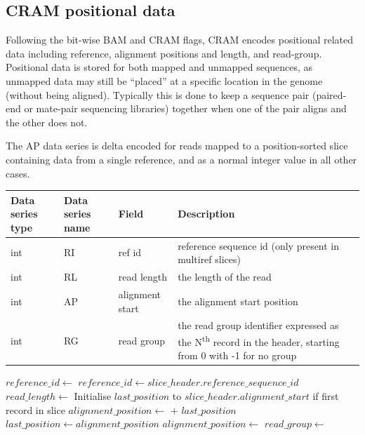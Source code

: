\documentclass[a4paper]{article}
\begin{document}
\subsection{\textbf{CRAM positional data}}
\label{subsec:positions}

Following the bit-wise BAM and CRAM flags, CRAM encodes positional related data including reference, alignment positions and length, and read-group.
Positional data is stored for both mapped and unmapped sequences, as unmapped data may still be ``placed'' at a specific location in the genome (without being aligned).
Typically this is done to keep a sequence pair (paired-end or mate-pair sequencing libraries) together when one of the pair aligns and the other does not.

The AP data series is delta encoded for reads mapped to a position-sorted slice containing data from a single reference, and as a normal integer value in all other cases.

\begin{tabular}{|>{\raggedright}p{70pt}|>{\raggedright}p{75pt}|>{\raggedright}p{90pt}|>{\raggedright}p{171pt}|}
\hline
\textbf{Data series type} & \textbf{Data series name} & \textbf{Field} & \textbf{Description}\tabularnewline
\hline
int & RI & ref id & reference sequence id (only present in multiref slices)\tabularnewline
\hline
int & RL & read length & the length of the read\tabularnewline
\hline
int & AP & alignment start & the alignment start position\tabularnewline
\hline
int & RG & read group & the read group identifier expressed as the N\textsuperscript{th} record in the header, starting from 0 with -1 for no group\tabularnewline
\hline
\end{tabular}

\vskip 20pt
\begin{algorithmic}[1]
  \State $reference\_id\gets$ 
\Else
  \State $reference\_id\gets slice\_header.reference\_sequence\_id$
\EndIf
\State $read\_length \gets$ 
    \State Initialise $last\_position$ to $slice\_header.alignment\_start$ if first record in slice
    \State $alignment\_position \gets$  + $last\_position$
    \State $last\_position \gets alignment\_position$
\Else
    \State $alignment\_position \gets$ 
\EndIf
\State $read\_group \gets$ 
\EndProcedure
\end{algorithmic}
\end{document}

